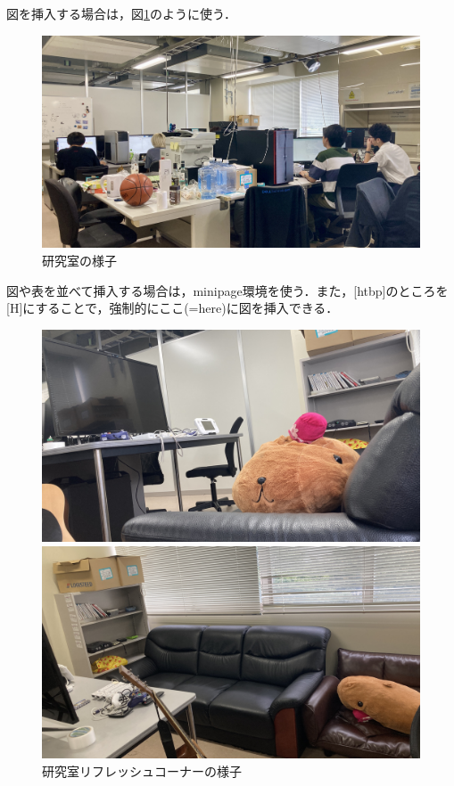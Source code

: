 図を挿入する場合は，図\ref{fig:labpic}のように使う．
\begin{figure}[htbp]
    \centering
    \includegraphics[width=.5\textwidth]{figure/labpic.jpg} %
    \caption{研究室の様子} %
    \label{fig:labpic} %
\end{figure}

図や表を並べて挿入する場合は，minipage環境を使う．また，[htbp]のところを[H]にすることで，強制的にここ(=here)に図を挿入できる．
\begin{figure}[H]
	\begin{minipage}{.5\textwidth}
        \centering
		\includegraphics[width=.95\textwidth]{figure/labpic_game.jpg}
	\end{minipage}\hfill
 	\begin{minipage}{.5\textwidth}
        \centering
		\includegraphics[width=.95\textwidth]{figure/labpic_sofa.jpg}
	\end{minipage}\hfill
	\caption{研究室リフレッシュコーナーの様子}\label{fig:labpic_ref}
\end{figure}

